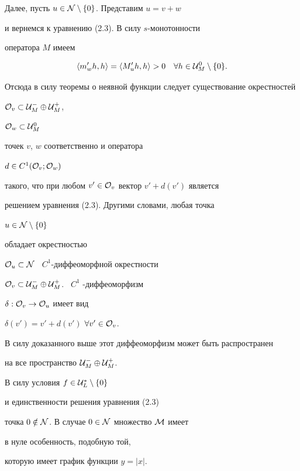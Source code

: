 \begin{pf}
Далее, пусть $u\in {\cal N}\setminus \{0\}$. Представим $u=v+w$


и вернемся к уравнению (2.3). В силу $s$-монотонности


оператора $M$ имеем


$$


\langle m'_w h, h\rangle = \langle M'_u h, h\rangle >0\quad


\forall h\in{\cal U}^0_M\setminus \{0\}.


$$


Отсюда в силу теоремы о неявной функции следует существование окрестностей


${\cal O}_v\subset {\cal U}^-_M\oplus{\cal U}^+_M$,


${\cal O}_w\subset {\cal U}^0_M$


точек $v$, $w$ соответственно и оператора


$d\in C^1 ({\cal O}_v; {\cal O}_w)$


такого, что при любом $v'\in{\cal O}_v$ вектор $v'+d(v')$ является


решением уравнения (2.3). Другими словами, любая точка


$u\in {\cal N}\setminus \{0\}$


обладает окрестностью


${\cal O}_u\subset{\cal N}$ \ $C^1$-диффеоморфной окрестности


${\cal O}_v\subset


{\cal U}^-_M\oplus{\cal U}^+_M$. \ $C^1$ -диффеоморфизм


$\delta : {\cal O}_v\to{\cal O}_u$ имеет вид


$\delta(v')=v'+d(v')$\; $\forall v'\in {\cal O}_v$.


В силу доказанного выше этот диффеоморфизм может быть распространен


на все пространство ${\cal U}^-_M\oplus{\cal U}^+_M$.


\end{pf}





\begin{notes}


В силу условия $f\in{\cal U}^*_L\setminus\{0\}$


и единственности решения уравнения (2.3)


точка $0\notin {\cal N}$. В случае $0\in{\cal N}$ множество $\cal M$ имеет


в нуле особенность, подобную той,


которую имеет график функции $y=|x|$.


\end{notes}






